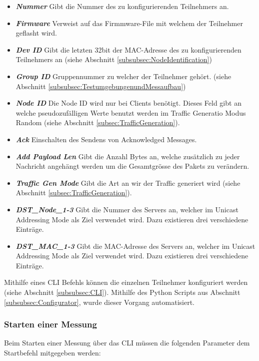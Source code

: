 \begin{itemize}
	\item \textit{\textbf{Nummer}} Gibt die Nummer des zu konfigurierenden Teilnehmers an.
	\item \textit{\textbf{Firmware}} Verweist auf das Firmmware-File mit welchem der Teilnehmer geflasht wird.
	\item \textit{\textbf{Dev ID}} Gibt die letzten 32bit der MAC-Adresse des zu konfigurierenden Teilnehmers an (siehe Abschnitt \ref{subsubsec:NodeIdentification})
	\item \textit{\textbf{Group ID}} Gruppennummer zu welcher der Teilnehmer gehört. (siehe Abschnitt \ref{subsubsec:TestumgebungenundMessaufbau})
	\item \textit{\textbf{Node ID}} Die Node ID wird nur bei Clients benötigt. Dieses Feld gibt an welche pseudozufälligen Werte benutzt werden im Traffic Generatio Modus Random (siehe Abschnitt \ref{subsec:TrafficGeneration}).
	\item \textit{\textbf{Ack}} Einschalten des Sendens von Acknowledged Messages.
	\item \textit{\textbf{Add Payload Len}} Gibt die Anzahl Bytes an, welche zusätzlich zu jeder Nachricht angehängt werden um die Gesamtgrösse des Pakets zu verändern.
	\item \textit{\textbf{Traffic Gen Mode}} Gibt die Art an wir der Traffic generiert wird (siehe Abschnitt \ref{subsec:TrafficGeneration}).  
	\item \textit{\textbf{DST\_Node\_1-3}} Gibt die Nummer des Servers an, welcher im Unicast Addressing Mode als Ziel verwendet wird. Dazu existieren drei verschiedene Einträge.  
	\item \textit{\textbf{DST\_MAC\_1-3}} Gibt die MAC-Adresse des Servers an, welcher im Unicast Addressing Mode als Ziel verwendet wird. Dazu existieren drei verschiedene Einträge. 
\end{itemize}

Mithilfe eines CLI Befehls können die einzelnen Teilnehmer konfiguriert werden (siehe Abschnitt \ref{subsubsec:CLI}). Mithilfe des Python Scripts aus Abschnitt \ref{subsubsec:Configurator}, wurde dieser Vorgang automatisiert. 

\subsubsection{Starten einer Messung}\label{subsubsec:StartofMeassurment}
Beim Starten einer Messung über das CLI müssen die folgenden Parameter dem Startbefehl mitgegeben werden: 

